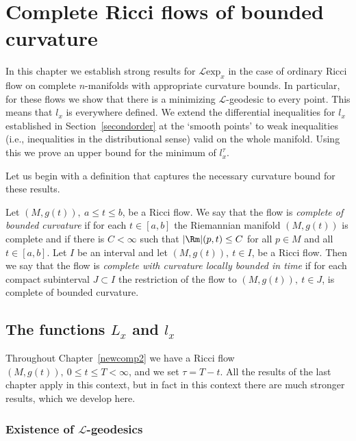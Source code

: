 \chapter{Complete Ricci flows of bounded curvature}
\label{chap:complete-ricci-flows}
\label{newcomp2}

 In this chapter we establish strong results for ${\mathcal L}\mathrm{exp}_x$ in the case of ordinary Ricci flow on complete $n$-manifolds
with appropriate curvature bounds. In particular, for these flows we
show that there is a minimizing ${\mathcal L}$-geodesic to every
point. This means that $l_x$ is everywhere defined.
We extend the differential inequalities for $l_x$ established in
Section~\ref{secondorder} at the `smooth points' to weak
inequalities (i.e., inequalities in the distributional sense) valid
on the whole manifold. Using this we prove an upper bound for the
minimum of $l_x^\tau$.

Let us begin with a definition that captures the necessary curvature
bound for these results.

\begin{definition}
\label{def:complete-bounded-curvature-flow}
Let $(M,g(t)),\ a\le t\le b$, be a  Ricci flow. We say that the flow
is {\em complete of bounded curvature} if for each $t\in [a,b]$ the
Riemannian manifold $(M,g(t))$ is complete and if there is
$C<\infty$ such that $|\Rm|(p,t)\le C$ for all $p\in M$ and all
$t\in [a,b]$. Let $I$ be an interval and let $(M,g(t)),\ t\in I$, be
a Ricci flow. Then we say that the flow is {\em complete with
curvature locally bounded in time} if for each compact subinterval
$J\subset I$ the restriction of the flow to $(M,g(t)),\ t\in J$, is
complete of bounded curvature.
\end{definition}




\section{The functions $L_{x}$ and $l_{x}$}

Throughout Chapter~\ref{newcomp2} we have a Ricci flow $(M,g(t)),\
0\le t\le T<\infty$, and we set $\tau=T-t$. All the results of the
last chapter apply in this context,
 but in fact in this context there are much stronger results, which
we develop here.

\subsection{Existence of ${\mathcal L}$-geodesics}


